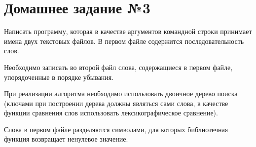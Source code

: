\section*{Домашнее задание №3}


Написать программу, которая в качестве аргументов командной строки
принимает имена двух текстовых файлов. В первом файле содержится
последовательность слов.

Необходимо записать во второй файл слова,
содержащиеся в первом файле, упорядоченные в порядке убывания.

При
реализации алгоритма необходимо использовать двоичное дерево поиска
(ключами при построении дерева должны являться сами слова, в качестве
функции сравнения слов использовать лексикографическое сравнение).

Слова в первом файле разделяются символами, для которых библиотечная
функция  возвращает ненулевое значение.
